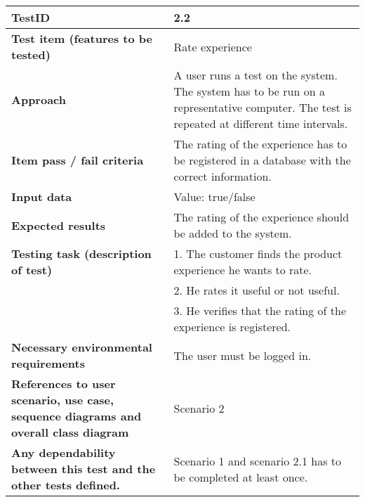 \begin{table}
    \centering
	\begin{tabularx}{1.2\textwidth}{| p{5cm} | X |}
	\hline
	\textbf{TestID} 																& 2.2\\ \hline
	\textbf{Test item (features to be tested)} 											& Rate experience\\ \hline
	\textbf{Approach} 															& A user runs a test on the system. The system has to be run on a representative computer. 
																			The test is repeated at different time intervals.\\ \hline
	\textbf{Item pass / fail criteria} 													& The rating of the experience has to be registered in a database with the correct information.\\ \hline
	\textbf{Input data} 															& Value: true/false\\
	\textbf{Expected results}									 					& The rating of the experience should be added to the system.\\ \hline
	\textbf{Testing task (description of test)} 											& 1. The customer finds the product experience he wants to rate.\\
																			& 2. He rates it useful or not useful.\\
																			& 3. He verifies that the rating of the experience is registered.\\ \hline
	\textbf{Necessary environmental requirements} 										& The user must be logged in.\\ \hline
	\textbf{References to user scenario, use case, sequence diagrams and overall class diagram} 		& Scenario 2\\ \hline
	\textbf{Any dependability between this test and the other tests defined.}		 				& Scenario 1 and scenario 2.1 has to be completed at least once.\\ \hline
	\end{tabularx}
\end{table}


